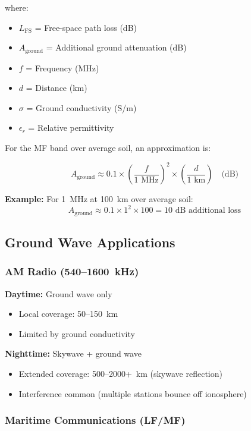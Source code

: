 where:
\begin{itemize}
\item $L_{\text{FS}}$ = Free-space path loss (dB)
\item $A_{\text{ground}}$ = Additional ground attenuation (dB)
\item $f$ = Frequency (MHz)
\item $d$ = Distance (km)
\item $\sigma$ = Ground conductivity (S/m)
\item $\epsilon_r$ = Relative permittivity
\end{itemize}

For the MF band over average soil, an approximation is:

\begin{equation}
\label{eq:ground-attenuation}
A_{\text{ground}} \approx 0.1 \times \left(\frac{f}{1\text{ MHz}}\right)^2 \times \left(\frac{d}{1\text{ km}}\right) \quad \text{(dB)}
\end{equation}

\textbf{Example:} For 1~MHz at 100~km over average soil:
\begin{equation}
A_{\text{ground}} \approx 0.1 \times 1^2 \times 100 = 10\text{ dB additional loss}
\end{equation}

\subsection{Ground Wave Applications}

\subsubsection{AM Radio (540--1600~kHz)}

\textbf{Daytime:} Ground wave only
\begin{itemize}
\item Local coverage: 50--150~km
\item Limited by ground conductivity
\end{itemize}

\textbf{Nighttime:} Skywave + ground wave
\begin{itemize}
\item Extended coverage: 500--2000+~km (skywave reflection)
\item Interference common (multiple stations bounce off ionosphere)
\end{itemize}

\subsubsection{Maritime Communications (LF/MF)}

